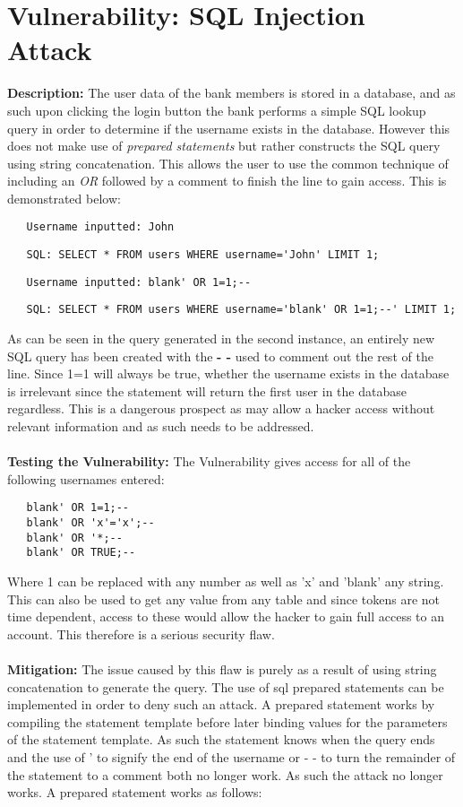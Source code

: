 
\section{Vulnerability: SQL Injection Attack}
\label{sec:background}
\textbf{Description:} The user data of the bank members is stored in a database, and as such upon clicking the login button the bank performs a simple SQL lookup query in order to
determine if the username exists in the database. However this does not make use of \textit{prepared statements} but rather constructs the SQL query using string concatenation.
This allows the user to use the common technique of including an \textit{OR} followed by a comment to finish the line to gain access. This is demonstrated below:
\begin{verbatim}
   Username inputted: John
\end{verbatim}
\begin{verbatim}
   SQL: SELECT * FROM users WHERE username='John' LIMIT 1;
\end{verbatim}
\begin{verbatim}
   Username inputted: blank' OR 1=1;--
\end{verbatim}
\begin{verbatim}
   SQL: SELECT * FROM users WHERE username='blank' OR 1=1;--' LIMIT 1;
\end{verbatim}
As can be seen in the query generated in the second instance, an entirely new SQL query has been created with the \textbf{- -} used to comment out the rest of the line.
Since 1=1 will always be true, whether the username exists in the database is irrelevant since the statement will return the first user in the database regardless. This is a dangerous
prospect as may allow a hacker access without relevant information and as such needs to be addressed.\\ \\
\textbf{Testing the Vulnerability:} The Vulnerability gives access for all of the following usernames entered:
 
\begin{verbatim}
   blank' OR 1=1;--
   blank' OR 'x'='x';--
   blank' OR '*;--
   blank' OR TRUE;--
\end{verbatim}
Where 1 can be replaced with any number as well as 'x' and 'blank' any string. This can also be used to get any value from any table and since tokens are not time dependent, access
to these would allow the hacker to gain full access to an account. This therefore is a serious security flaw.\\ \\
\textbf{Mitigation:} The issue caused by this flaw is purely as a result of using string concatenation to generate the query. The use of sql prepared statements can be implemented in order
to deny such an attack. A prepared statement works by compiling the statement template before later binding values for the parameters of the statement template. As such the statement knows
when the query ends and  the use of ' to signify the end of the username or - - to turn the remainder of the statement to a comment both no longer work. As such the attack no longer works. A
prepared statement works as follows:\\
 

